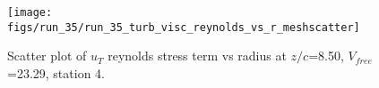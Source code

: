 \begin{figure}[H]
\centering
\texttt{[image: figs/run\_35/run\_35\_turb\_visc\_reynolds\_vs\_r\_meshscatter]}
\caption{Scatter plot of $
u_T$ reynolds stress term vs radius at $z/c$=8.50, $V_{free}$=23.29, station 4.}
\label{fig:run_35_turb_visc_reynolds_vs_r_meshscatter}
\end{figure}


